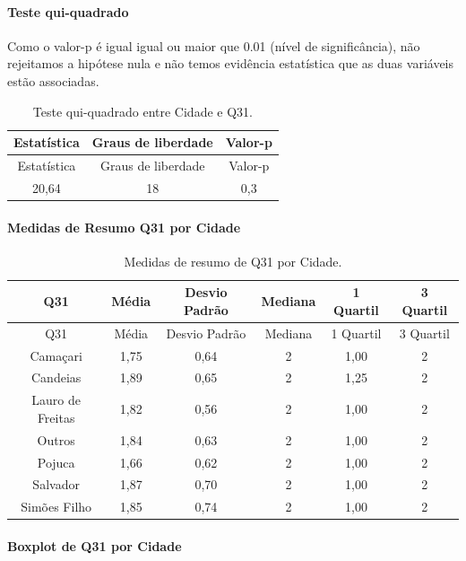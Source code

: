 \documentclass[]{article}
\let\oldparagraph\paragraph
\renewcommand{\paragraph}[1]{\oldparagraph{#1}\mbox{}}
\begin{document}
\hypertarget{teste-qui-quadrado-87}{%
\paragraph{Teste qui-quadrado}\label{teste-qui-quadrado-87}}

Como o valor-p é igual igual ou maior que 0.01 (nível de significância), não rejeitamos a hipótese nula e não temos evidência estatística que as duas variáveis estão associadas.

\begin{longtable}[]{@{}ccc@{}}
\caption{\label{tab:unnamed-chunk-1018}Teste qui-quadrado entre Cidade e Q31.}\tabularnewline
\toprule
Estatística & Graus de liberdade & Valor-p\tabularnewline
\midrule
\endfirsthead
\toprule
Estatística & Graus de liberdade & Valor-p\tabularnewline
\midrule
\endhead
20,64 & 18 & 0,3\tabularnewline
\bottomrule
\end{longtable}

\cleardoublepage

\hypertarget{medidas-de-resumo-q31-por-cidade}{%
\paragraph{Medidas de Resumo Q31 por Cidade}\label{medidas-de-resumo-q31-por-cidade}}

\begin{longtable}[]{@{}cccccc@{}}
\caption{\label{tab:unnamed-chunk-1019}Medidas de resumo de Q31 por Cidade.}\tabularnewline
\toprule
Q31 & Média & Desvio Padrão & Mediana & 1 Quartil & 3 Quartil\tabularnewline
\midrule
\endfirsthead
\toprule
Q31 & Média & Desvio Padrão & Mediana & 1 Quartil & 3 Quartil\tabularnewline
\midrule
\endhead
Camaçari & 1,75 & 0,64 & 2 & 1,00 & 2\tabularnewline
Candeias & 1,89 & 0,65 & 2 & 1,25 & 2\tabularnewline
Lauro de Freitas & 1,82 & 0,56 & 2 & 1,00 & 2\tabularnewline
Outros & 1,84 & 0,63 & 2 & 1,00 & 2\tabularnewline
Pojuca & 1,66 & 0,62 & 2 & 1,00 & 2\tabularnewline
Salvador & 1,87 & 0,70 & 2 & 1,00 & 2\tabularnewline
Simões Filho & 1,85 & 0,74 & 2 & 1,00 & 2\tabularnewline
\bottomrule
\end{longtable}

\hypertarget{boxplot-de-q31-por-cidade}{%
\paragraph{Boxplot de Q31 por Cidade}\label{boxplot-de-q31-por-cidade}}
\end{document}
